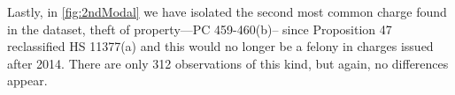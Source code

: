 Lastly, in \autoref{fig:2ndModal} we have isolated the second most
common charge found in the dataset, theft of property—PC 459-460(b)–
since Proposition 47 reclassified HS 11377(a) and this would no longer
be a felony in charges issued after 2014. There are only 312
observations of this kind, but again, no differences appear.
